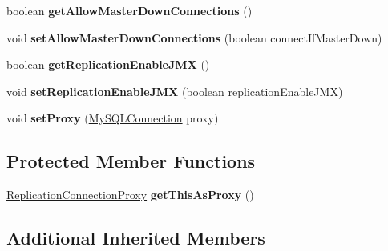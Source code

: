 \begin{DoxyCompactItemize}
\mbox{\label{classcom_1_1mysql_1_1jdbc_1_1_replication_my_s_q_l_connection_ac88ef994b8edd0f355060155cd01a12a}} 
boolean {\bfseries get\+Allow\+Master\+Down\+Connections} ()
\item 
\mbox{\label{classcom_1_1mysql_1_1jdbc_1_1_replication_my_s_q_l_connection_ae6a98df9b51a4bae335dcd367d7feb5c}} 
void {\bfseries set\+Allow\+Master\+Down\+Connections} (boolean connect\+If\+Master\+Down)
\item 
\mbox{\label{classcom_1_1mysql_1_1jdbc_1_1_replication_my_s_q_l_connection_add4c7ddc3fdc6ed6f3807898e4d621b6}} 
boolean {\bfseries get\+Replication\+Enable\+J\+MX} ()
\item 
\mbox{\label{classcom_1_1mysql_1_1jdbc_1_1_replication_my_s_q_l_connection_ac1daa50fce2b418ef333706772bbff68}} 
void {\bfseries set\+Replication\+Enable\+J\+MX} (boolean replication\+Enable\+J\+MX)
\item 
\mbox{\label{classcom_1_1mysql_1_1jdbc_1_1_replication_my_s_q_l_connection_af1200607ac2930e922169ab95cb29671}} 
void {\bfseries set\+Proxy} (\mbox{\hyperlink{interfacecom_1_1mysql_1_1jdbc_1_1_my_s_q_l_connection}{My\+S\+Q\+L\+Connection}} proxy)
\end{DoxyCompactItemize}
\subsection*{Protected Member Functions}
\begin{DoxyCompactItemize}
\item 
\mbox{\label{classcom_1_1mysql_1_1jdbc_1_1_replication_my_s_q_l_connection_a7115ee21b211a55a642c10db74d17546}} 
\mbox{\hyperlink{classcom_1_1mysql_1_1jdbc_1_1_replication_connection_proxy}{Replication\+Connection\+Proxy}} {\bfseries get\+This\+As\+Proxy} ()
\end{DoxyCompactItemize}
\subsection*{Additional Inherited Members}


